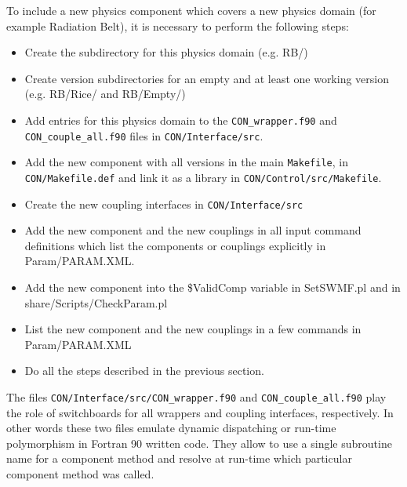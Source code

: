 To include a new physics component which covers a new physics domain
(for example Radiation Belt), it is necessary to perform the following steps:
\begin{itemize}
\item Create the subdirectory for this physics domain (e.g. RB/) 

\item Create version subdirectories
      for an empty and at least one working version 
      (e.g. RB/Rice/ and RB/Empty/)

\item Add entries for this physics domain to the 
      {\tt CON\_wrapper.f90} and {\tt CON\_couple\_all.f90}
      files in {\tt CON/Interface/src}.

\item Add the new component with all versions in the main {\tt Makefile}, in 
      {\tt CON/Makefile.def} and link it as a library in
      {\tt CON/Control/src/Makefile}.

\item Create the new coupling interfaces in {\tt CON/Interface/src}

\item Add the new component and the new couplings in all 
      input command definitions 
      which list the components or couplings explicitly in Param/PARAM.XML.

\item Add the new component into the \$ValidComp variable in
      SetSWMF.pl and in share/Scripts/CheckParam.pl

\item List the new component and the new couplings in a few 
      commands in Param/PARAM.XML

\item Do all the steps described in the previous section.
\end{itemize}
The files {\tt CON/Interface/src/CON\_wrapper.f90} and 
{\tt CON\_couple\_all.f90} play the role 
of switchboards for all wrappers and coupling interfaces, respectively. 
In other words these two files emulate dynamic dispatching or run-time 
polymorphism in Fortran 90 written code. They allow to use a single
subroutine name for a component method and resolve at run-time which 
particular component method was called.

%

